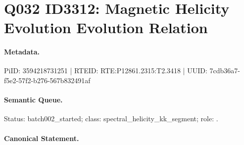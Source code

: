 \section*{Q032 ID3312: Magnetic Helicity Evolution Evolution Relation}
\paragraph{Metadata.}
PiID: 3594218731251 | RTEID: RTE:P12861.2315:T2.3418 | UUID: 7cdb36a7-f5e2-57f2-b276-567b832491af

\paragraph{Semantic Queue.}
Status: batch002\_started; class: spectral\_helicity\_kk\_segment; role: .

\paragraph{Canonical Statement.}

